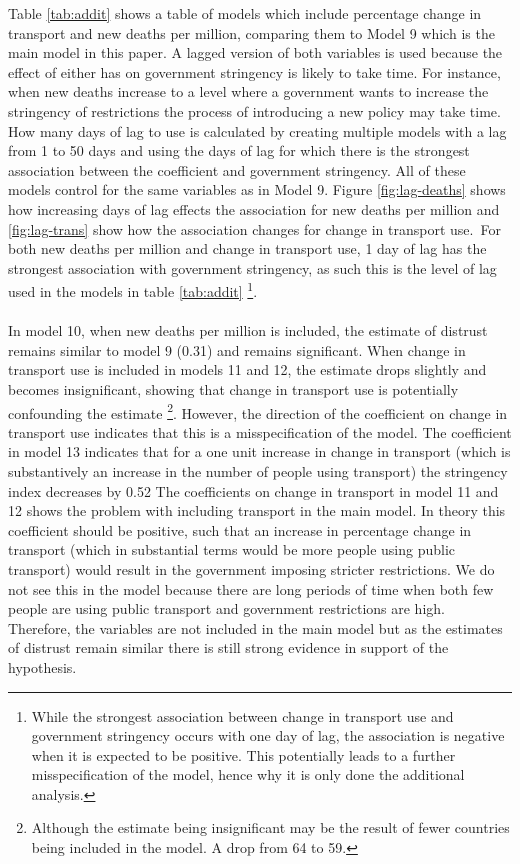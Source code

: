 \documentclass[
  11pt,
]{article}
\begin{document}
Table \ref{tab:addit} shows a table of models which include percentage change in transport and new deaths per million, comparing them to Model 9 which is the main model in this paper. A lagged version of both variables is used because the effect of either has on government stringency is likely to take time. For instance, when new deaths increase to a level where a government wants to increase the stringency of restrictions the process of introducing a new policy may take time. How many days of lag to use is calculated by creating multiple models with a lag from 1 to 50 days and using the days of lag for which there is the strongest association between the coefficient and government stringency. All of these models control for the same variables as in Model 9. Figure \ref{fig:lag-deaths} shows how increasing days of lag effects the association for new deaths per million and \ref{fig:lag-trans} show how the association changes for change in transport use.~For both new deaths per million and change in transport use, 1 day of lag has the strongest association with government stringency, as such this is the level of lag used in the models in table \ref{tab:addit} \footnote{While the strongest association between change in transport use and government stringency occurs with one day of lag, the association is negative when it is expected to be positive. This potentially leads to a further misspecification of the model, hence why it is only done the additional analysis.}.\\
~\\
In model 10, when new deaths per million is included, the estimate of distrust remains similar to model 9 (0.31) and remains significant. When change in transport use is included in models 11 and 12, the estimate drops slightly and becomes insignificant, showing that change in transport use is potentially confounding the estimate \footnote{Although the estimate being insignificant may be the result of fewer countries being included in the model. A drop from 64 to 59.}. However, the direction of the coefficient on change in transport use indicates that this is a misspecification of the model. The coefficient in model 13 indicates that for a one unit increase in change in transport (which is substantively an increase in the number of people using transport) the stringency index decreases by 0.52 The coefficients on change in transport in model 11 and 12 shows the problem with including transport in the main model. In theory this coefficient should be positive, such that an increase in percentage change in transport (which in substantial terms would be more people using public transport) would result in the government imposing stricter restrictions. We do not see this in the model because there are long periods of time when both few people are using public transport and government restrictions are high. Therefore, the variables are not included in the main model but as the estimates of distrust remain similar there is still strong evidence in support of the hypothesis.\\
\end{document}
